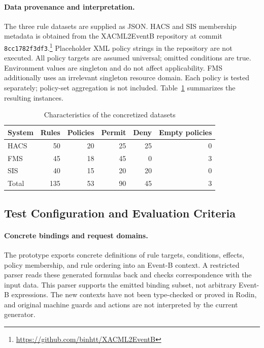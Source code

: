 \paragraph{Data provenance and interpretation.}
The three rule datasets are supplied as JSON. HACS and SIS membership
metadata is obtained from the XACML2EventB repository at commit
\texttt{8cc1782f3df3}.\footnote{\url{https://github.com/binhtt/XACML2EventB}}
Placeholder XML policy strings in the repository are not executed.
All policy targets are assumed universal; omitted conditions are true.
Environment values are singleton and do not affect applicability.
FMS additionally uses an irrelevant singleton resource domain.
Each policy is tested separately; policy-set aggregation is not
included. Table~\ref{tab:exp_datasets} summarizes the resulting instances.

\begin{table}[htbp]
\centering
\caption{Characteristics of the concretized datasets}
\label{tab:exp_datasets}
\small
\begin{tabular}{lrrrrr}
\hline
System & Rules & Policies & Permit & Deny & Empty policies \\
\hline
HACS & 50 & 20 & 25 & 25 & 0 \\
FMS & 45 & 18 & 45 & 0 & 3 \\
SIS & 40 & 15 & 20 & 20 & 0 \\
\hline
Total & 135 & 53 & 90 & 45 & 3 \\
\hline
\end{tabular}
\end{table}

\subsection{Test Configuration and Evaluation Criteria}
\label{subsec:exp_configuration}

\paragraph{Concrete bindings and request domains.}
The prototype exports concrete definitions of rule targets, conditions,
effects, policy membership, and rule ordering into an Event-B context.
A restricted parser reads these generated formulas back and checks
correspondence with the input data. This parser supports the emitted
binding subset, not arbitrary Event-B expressions. The new contexts
have not been type-checked or proved in Rodin, and original machine
guards and actions are not interpreted by the current generator.

